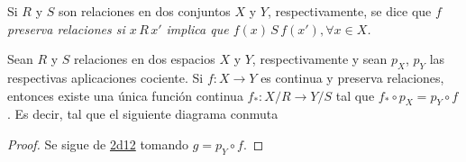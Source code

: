 
\begin{definition}
Si $R$ y $S$ son relaciones en dos conjuntos $X$ y $Y$, respectivamente, se dice que $f$ \itshape{preserva relaciones} si $x \, R \, x'$ implica que $f(x) \, S \, f(x'), \forall x \in X$.
\end{definition}

\begin{corollary}
Sean $R$ y $S$ relaciones en dos espacios $X$ y $Y$, respectivamente y sean $p_X$, $p_Y$ las respectivas aplicaciones cociente. Si $f : X \longrightarrow Y$ es continua y preserva relaciones, entonces existe una única función continua $f_* : X/R \longrightarrow Y/S$ tal que $f_* \circ p_X = p_Y \circ f$. Es decir, tal que el siguiente diagrama conmuta 
\bigskip

\end{corollary}

\begin{proof}
Se sigue de \hyperref[card:2d12]{\textsf{2d12}} tomando $g = p_Y \circ f$.
\end{proof}
